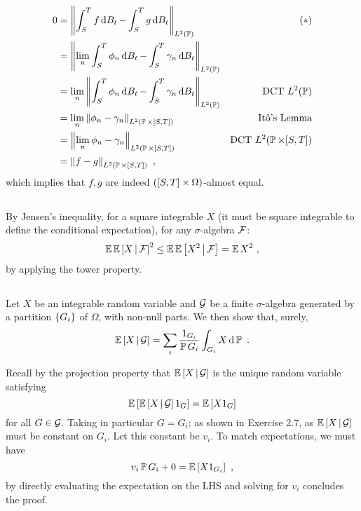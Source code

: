 \documentclass{article}
\begin{document}
        \begin{align*}
          0
          &=\norm{\int_S^Tf\d{B_t}-\int_S^Tg\d{B_t}}_{L^2(\P)}&(*)\\
          &=\norm{\lim_n\int_S^T\phi_n\d{B_t}-\int_S^T\gamma_n\d{B_t}}_{L^2(\P)}&\\
          &=\lim_n\norm{\int_S^T\phi_n\d{B_t}-\int_S^T\gamma_n\d{B_t}}_{L^2(\P)}&\text{DCT }L^2(\P)\\
          &=\lim_n\norm{\phi_n-\gamma_n}_{L^2(\P\times[S,T])}&\text{It\^{o}'s Lemma}\\
          &=\norm{\lim_n\phi_n-\gamma_n}_{L^2(\P\times[S,T])}&\text{DCT }L^2(\P\times[S,T])\\
          &=\norm{f-g}_{L^2(\P\times[S,T])}\,\,,
        \end{align*}
        which implies that \(f,g\) are indeed \(\pa{[S,T]\times\Omega}\)-almost equal.

        \subsection{}

        
        By Jensen's inequality, for a square integrable \(X\) (it must be square integrable to define the conditional expectation), for any \(\sigma\)-algebra \(\mcF\):
        \[
          \E\CE{X}{\mcF}^2\le \E\CE{X^2}{\mcF}=\E X^2\,\,,
        \]
        by applying the tower property.

        \subsection{}

        Let \(X\) be an integrable random variable and \(\mcG\) be a finite \(\sigma\)-algebra generated by a partition \(\ca{G_i}\) of \(\Omega\), with non-null parts. We then show that, surely,
        \[
          \CE{X}{\mcG}=\sum_i\frac{1_{G_i}}{\P G_i}\int_{G_i}X\d{\P}\,\,.
        \]

        Recall by the projection property that \(\CE{X}{\mcG}\) is the unique random variable satisfying
        \[
          \E\ha{\CE{X}{\mcG}1_G}=\E\ha{X1_G}
        \]
        for all \(G\in \mcG\). Taking in particular \(G=G_i\); as shown in Exercise 2.7, as \(\CE{X}{\mcG}\) must be constant on \(G_i\). Let this constant be \(v_i\). To match expectations, we must have
        \[
          v_i\P G_i+0=\E\ha{X1_{G_i}}\,\,,
        \]
        by directly evaluating the expectation on the LHS and solving for \(v_i\) concludes the proof.
        
\end{document}
